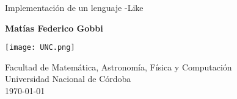 \begin{titlepage}
    \begin{center}
    
    \vspace*{1cm}
    
    \Huge
    \textbf{\Lenguaje{}}
    
    \vspace{0.5cm}
    
    \Large
    Implementación de un lenguaje \Pascal{}-Like
    
    \vspace{1.5cm}
    
    \textbf{Matías Federico Gobbi}
    
    \vfill
    
    \texttt{[image: UNC.png]}
    
    Facultad de Matemática, Astronomía, Física y Computación
    \\
    Universidad Nacional de Córdoba
    \\
    \today

    \end{center}
\end{titlepage}